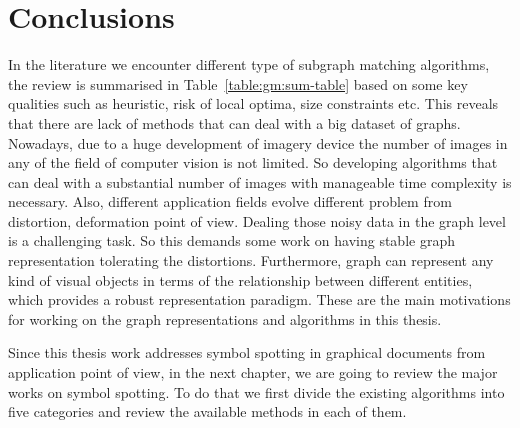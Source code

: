 \section{Conclusions}
\label{sec:gm:concl}
In the literature we encounter different type of subgraph matching algorithms, the review is summarised in Table~\ref{table:gm:sum-table} based on some key qualities such as heuristic, risk of local optima, size constraints etc. This reveals that there are lack of methods that can deal with a big dataset of graphs. Nowadays, due to a huge development of imagery device the number of images in any of the field of computer vision is not limited. So developing algorithms that can deal with a substantial number of images with manageable time complexity is necessary. Also, different application fields evolve different problem from distortion, deformation point of view. Dealing those noisy data in the graph level is a challenging task. So this demands some work on having stable graph representation tolerating the distortions. Furthermore, graph can represent any kind of visual objects in terms of the relationship between different entities, which provides a robust representation paradigm. These are the main motivations for working on the graph representations and algorithms in this thesis.

Since this thesis work addresses symbol spotting in graphical documents from application point of view, in the next chapter, we are going to review the major works on symbol spotting. To do that we first divide the existing algorithms into five categories and review the available methods in each of them.
